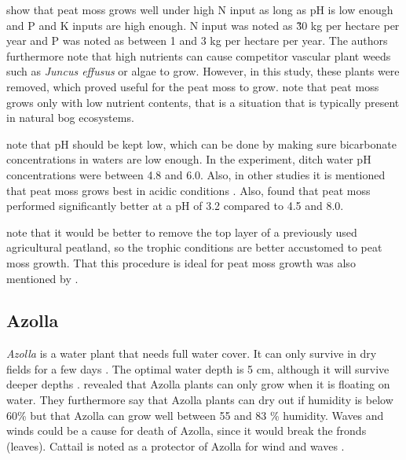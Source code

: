 \documentclass[a4paper,12pt]{scrbook}
\begin{document}
\citet{Temmink2017196} show that peat moss grows well under high N input as long as pH is low enough and P and K inputs are high enough. 
N input was noted as \~ 30 kg per hectare per year and P was noted as between 1 and 3 kg per hectare per year. The authors furthermore note that high nutrients can cause competitor vascular plant weeds such as \textit{Juncus effusus} or algae to grow. However, in this study, these plants were removed, which proved useful for the peat moss to grow. \citep{wichtmann2016paludiculture} note that peat moss grows only with low nutrient contents, that is a situation that is typically present in natural bog ecosystems.


\citet{Temmink2017196} note that pH should be kept low, which can be done by making sure bicarbonate concentrations in waters are low enough. In the experiment, ditch water pH concentrations were between 4.8 and 6.0. Also, in other studies it is mentioned that peat moss grows best in acidic conditions \citep{wichtmann2016paludiculture}. Also, \citet{gaudig2005growing} found that peat moss performed significantly better at a pH of 3.2 compared to 4.5 and 8.0. 

\citet{fritz2014paludicultuur} note that it would be better to remove the top layer of a previously used agricultural peatland, so the trophic conditions are better accustomed to peat moss growth. That this procedure is ideal for peat moss growth was also mentioned by \citet{Temmink2017196}.

\subsection{Azolla}

\textit{Azolla} is a water plant that needs full water cover. It can only survive in dry fields for a few days \citep{wagner1997azolla}. The optimal water depth is 5 cm, although it will survive deeper depths \citep{wagner1997azolla}. \citet{sabetraftar2013review} revealed that Azolla plants can only grow when it is floating on water. They furthermore say that Azolla plants can dry out if humidity is below 60\% but that Azolla can grow well between 55 and 83 \% humidity.  Waves and winds could be a cause for death of Azolla, since it would break the fronds (leaves). Cattail is noted as a protector of Azolla for wind and waves \citep{sabetraftar2013review}.  
\end{document}
